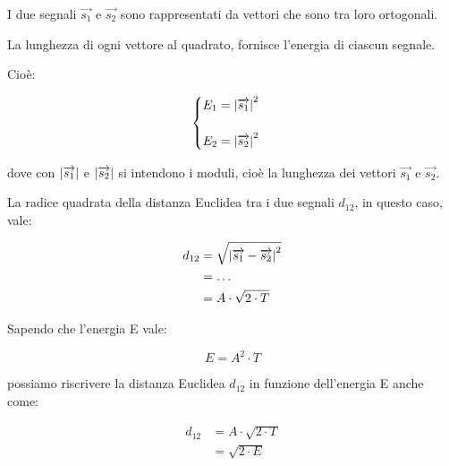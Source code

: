 I due segnali $\overrightarrow{s_1}$ e $\overrightarrow{s_2}$ sono rappresentati da vettori che sono tra loro ortogonali. \newline 

La lunghezza di ogni vettore al quadrato, fornisce l'energia di ciascun segnale. \newline 

Cioè: 

{
    \Large 
    \begin{equation}
        \begin{cases}
        E_1 = \abs{\overrightarrow{s_1}}^{2}
        \\
        \quad
        \\
        E_2 = \abs{\overrightarrow{s_2}}^{2}
        \end{cases}
    \end{equation}
}


dove con $\abs{\overrightarrow{s_1}}$ e $\abs{\overrightarrow{s_2}}$ si intendono i moduli, 
cioè la lunghezza dei vettori $\overrightarrow{s_1}$ e $\overrightarrow{s_2}$. \newline 

La radice quadrata della distanza Euclidea tra i due segnali $d_{12}$, in questo caso, vale: 

{
    \Large 
    \begin{equation}
        \begin{split}
            d_{12}
            &= 
            \sqrt{\abs{\overrightarrow{s_1} - \overrightarrow{s_2}}^{2}}
            \\
            &= 
            \dots
            \\
            &= 
            A \cdot \sqrt{2 \cdot T}
        \end{split}
    \end{equation}
}

Sapendo che l'energia E vale: 

{
    \Large 
    \begin{equation}
        E = A^{2} \cdot T
    \end{equation}
}

possiamo riscrivere la distanza Euclidea $d_{12}$ in funzione dell'energia E anche come: 

{
    \Large
    \begin{equation}
        \begin{split}
            d_{12} 
            &= 
            A \cdot \sqrt{2 \cdot T}
            \\
            &= 
            \sqrt{2 \cdot E}
        \end{split}
    \end{equation}
}

